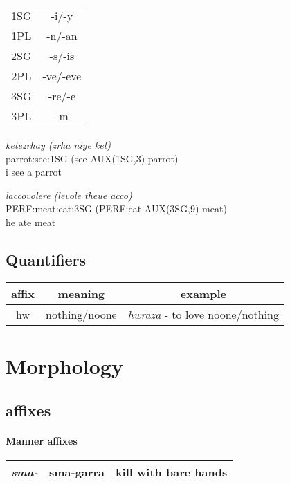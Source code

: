 \documentclass[8pt]{book}
\begin{document}
\begin{tabular}{c | c}
  1SG & -i/-y \\
  1PL & -n/-an \\
  2SG & -s/-is \\
  2PL & -ve/-eve \\
  3SG & -re/-e \\
  3PL & -m \\
\end{tabular}

\begin{exe}
\ex 
\gll \textit{ketezrhay (zrha niye ket)} \\
  parrot:see:1SG (see AUX(1SG,3) parrot) \\
\trans i see a parrot

\ex 
\gll \textit{laccovolere (levole theue acco)} \\
  PERF:meat:eat:3SG (PERF:eat AUX(3SG,9) meat) \\
\trans he ate meat
\end{exe}

\subsection{Quantifiers}

\begin{center}
\begin{tabular}{c | c | c}
affix & meaning & example \\ \hline
hw & nothing/noone & \textit{hwraza} - to love noone/nothing \\
\end{tabular}
\end{center}


\section{Morphology}
\subsection{affixes}
\paragraph{Manner affixes}
\begin{center}
\begin{tabular}{| c | c | c |}
  \hline
  \textit{sma-} & sma-garra & kill with bare hands \\ \hline
\end{tabular}
\end{center}
\end{document}
